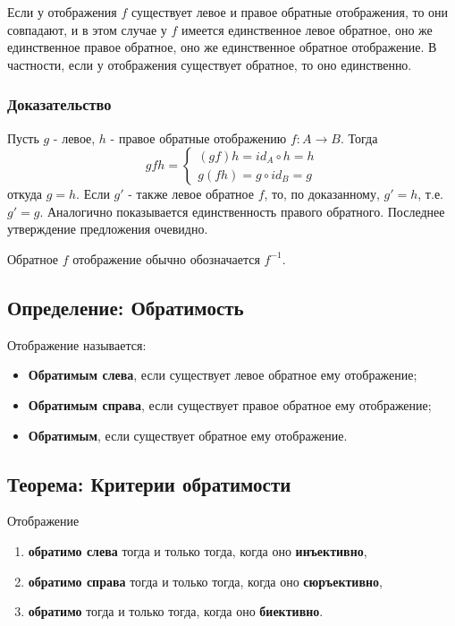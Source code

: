 \documentclass{article}
\begin{document}
Если у отображения $f$ существует левое и правое обратные отображения, то они совпадают, и в этом случае у $f$ имеется единственное левое обратное, оно же единственное правое обратное, оно же единственное обратное отображение. В частности, если у отображения существует обратное, то оно единственно.

\subsubsection*{Доказательство}
Пусть $g$ - левое, $h$ - правое обратные отображению $f : A \rightarrow B$. Тогда \[
gfh = \begin{cases}
(gf)h = id_A \circ h = h \\
g(fh) = g \circ id_B = g
\end{cases}
\] откуда $g = h$. Если $g'$ - также левое обратное $f$, то, по доказанному, $g' = h$, т.е. $g' = g$. Аналогично показывается единственность правого обратного. Последнее утверждение предложения очевидно.

Обратное $f$ отображение обычно обозначается $f^{-1}$.

\subsection{Определение: Обратимость}

Отображение называется:
\begin{itemize}
\item \textbf{Обратимым слева}, если существует левое обратное ему отображение;
\item \textbf{Обратимым справа}, если существует правое обратное ему отображение;
\item \textbf{Обратимым}, если существует обратное ему отображение.
\end{itemize}

\subsection{Теорема: Критерии обратимости}
Отображение
\begin{enumerate}
\item \textbf{обратимо слева} тогда и только тогда, когда оно \textbf{инъективно},
\item \textbf{обратимо справа} тогда и только тогда, когда оно \textbf{сюръективно},
\item \textbf{обратимо} тогда и только тогда, когда оно \textbf{биективно}.
\end{enumerate}
\end{document}
